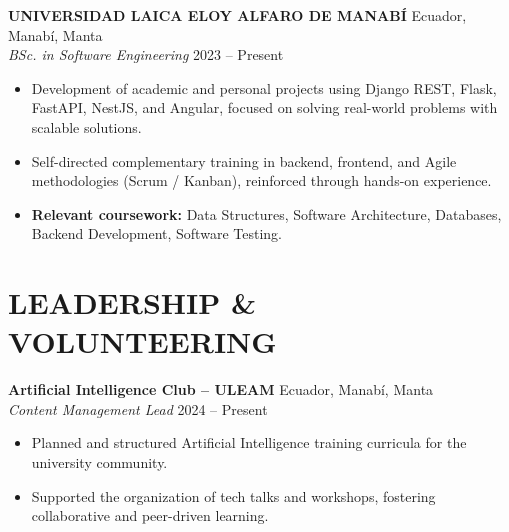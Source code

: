 \documentclass[11pt, a4paper]{article}
\begin{document}
\textbf{UNIVERSIDAD LAICA ELOY ALFARO DE MANABÍ} \hfill Ecuador, Manabí, Manta \\
\textit{BSc. in Software Engineering} \hfill 2023 -- Present

\begin{itemize}
\item Development of academic and personal projects using Django REST, Flask, FastAPI, NestJS, and Angular, focused on solving real-world problems with scalable solutions.
\item Self-directed complementary training in backend, frontend, and Agile methodologies (Scrum / Kanban), reinforced through hands-on experience.
\item \textbf{Relevant coursework:} Data Structures, Software Architecture, Databases, Backend Development, Software Testing.
\end{itemize}

\section*{LEADERSHIP \& VOLUNTEERING}

\textbf{Artificial Intelligence Club -- ULEAM} \hfill Ecuador, Manabí, Manta \\
\textit{Content Management Lead} \hfill 2024 -- Present

\begin{itemize}
\item Planned and structured Artificial Intelligence training curricula for the university community.
\item Supported the organization of tech talks and workshops, fostering collaborative and peer-driven learning.
\end{itemize}
\end{document}
